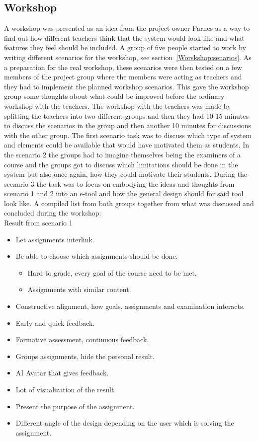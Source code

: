 \documentclass[a4paper,12pt]{article}
\begin{document}
\subsection{Workshop} 
A workshop was presented as an idea from the project owner Parnes as a way to find out how different teachers think that the system would look like and what features they feel should be included. A group of five people started to work by writing different scenarios for the workshop, see section~\ref{Worskshop:senarios}. As a preparation for the real workshop, these scenarios were then tested on a few members of the project group where the members were acting as teachers and they had to implement the planned workshop scenarios. This gave the workshop group some thoughts about what could be improved before the ordinary workshop with the teachers. 
The workshop with the teachers was made by splitting the teachers into two different groups and then they had 10-15 minutes to discuss the scenarios in the group and then another 10 minutes for discussions with the other group. 
The first scenario task was to discuss which type of system and elements could be available that would have motivated them as students. In the scenario 2 the groups had to imagine themselves being the examiners of a course and the groups got to discuss which limitations should be done in the system but also once again, how they could motivate their students. During the scenario 3 the task was to focus on embodying the ideas and thoughts from scenario 1 and 2 into an e-tool and how the general design should for said tool look like. A compiled list from both groups together from what was discussed and concluded during the workshop:
\\
Result from scenario 1
\begin{itemize}
\item Let assignments interlink.
\item Be able to choose which assignments should be done.
    \begin{itemize}
    \item Hard to grade, every goal of the course need to be met.
    \item Assignments with similar content.
    \end{itemize}
\item Constructive alignment, how goals, assignments and examination interacts.
\item Early and quick feedback.
\item Formative assessment, continuous feedback.
\item Groups assignments, hide the personal result.
\item AI Avatar that gives feedback.
\item Lot of visualization of the result.
\item Present the purpose of the assignment.
\item Different angle of the design depending on the user which is solving the assignment.
\end{itemize}
\end{document}
